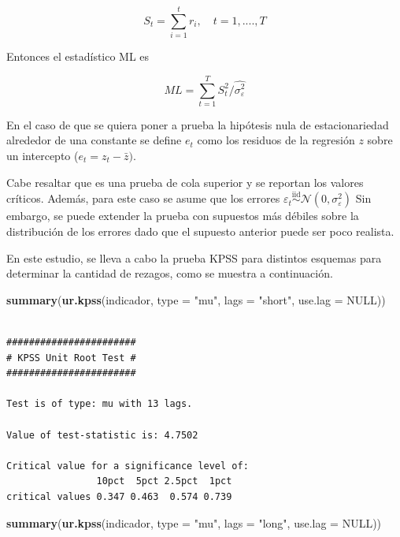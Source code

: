 \documentclass[
  12pt]{article}
\newenvironment{Shaded}{\begin{snugshade}}{\end{snugshade}}
\newcommand{\AttributeTok}[1]{\textcolor[rgb]{0.13,0.29,0.53}{#1}}
\newcommand{\ConstantTok}[1]{\textcolor[rgb]{0.56,0.35,0.01}{#1}}
\newcommand{\FunctionTok}[1]{\textcolor[rgb]{0.13,0.29,0.53}{\textbf{#1}}}
\newcommand{\NormalTok}[1]{#1}
\newcommand{\StringTok}[1]{\textcolor[rgb]{0.31,0.60,0.02}{#1}}
\begin{document}
\begin{equation}
    \label{eq: kpss5}
    S_t=\sum_{i=1}^t r_i, \quad t=1,....,T   
\end{equation}

Entonces el estadístico ML es

\begin{equation}
    \label{eq: kpss6}
    ML=\sum_{t=1}^T S^2_t/\hat{\sigma^2_\varepsilon}   
\end{equation}

En el caso de que se quiera poner a prueba la hipótesis nula de
estacionariedad alrededor de una constante se define \(e_t\) como los
residuos de la regresión \(z\) sobre un intercepto
(\(e_t=z_t-\bar{z})\).

Cabe resaltar que es una prueba de cola superior y se reportan los
valores críticos. Además, para este caso se asume que los errores
\(\varepsilon_t \overset{\text{iid}}{\sim} \mathcal{N}(0,\sigma_{\varepsilon}^2)\)
Sin embargo, se puede extender la prueba con supuestos más débiles sobre
la distribución de los errores dado que el supuesto anterior puede ser
poco realista.

En este estudio, se lleva a cabo la prueba KPSS para distintos esquemas
para determinar la cantidad de rezagos, como se muestra a continuación.

\newpage

\begin{Shaded}
\begin{Highlighting}[]
\FunctionTok{summary}\NormalTok{(}\FunctionTok{ur.kpss}\NormalTok{(indicador, }\AttributeTok{type =} \StringTok{"mu"}\NormalTok{, }\AttributeTok{lags =} \StringTok{"short"}\NormalTok{,}
        \AttributeTok{use.lag =} \ConstantTok{NULL}\NormalTok{))}
\end{Highlighting}
\end{Shaded}

\begin{verbatim}

####################### 
# KPSS Unit Root Test # 
####################### 

Test is of type: mu with 13 lags. 

Value of test-statistic is: 4.7502 

Critical value for a significance level of: 
                10pct  5pct 2.5pct  1pct
critical values 0.347 0.463  0.574 0.739
\end{verbatim}

\begin{Shaded}
\begin{Highlighting}[]
\FunctionTok{summary}\NormalTok{(}\FunctionTok{ur.kpss}\NormalTok{(indicador, }\AttributeTok{type =} \StringTok{"mu"}\NormalTok{, }
                \AttributeTok{lags =} \StringTok{"long"}\NormalTok{, }\AttributeTok{use.lag =} \ConstantTok{NULL}\NormalTok{))}
\end{Highlighting}
\end{Shaded}
\end{document}
